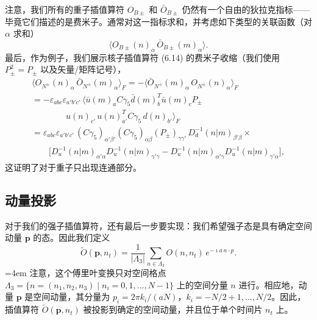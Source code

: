 注意，我们所有的重子插值算符 $O_{B\pm}$ 和 $\bar{O}_{B\pm}$ 仍然有一个自由的狄拉克指标——毕竟它们描述的是费米子。通常对这一指标求和，并考虑如下类型的关联函数（对 $\alpha$ 求和）
\begin{equation}
  \big\langle O_{B\pm}(n)_\alpha\, \bar{O}_{B\pm}(m)_\alpha \big\rangle .
\end{equation}
最后，作为例子，我们展示核子插值算符 (6.14) 的费米子收缩（我们使用 $P_\pm^2 = P_\pm$ 以及矢量/矩阵记号），
\begin{equation}
  \begin{gathered}
    \big\langle O_{N^\pm}(n)_\alpha\, \bar{O}_{N^\pm}(m)_\alpha \big\rangle_F
    = -\big\langle \bar{O}_{N^\pm}(m)_\alpha\, O_{N^\pm}(n)_\alpha \big\rangle_F \\
    = -\varepsilon_{abc}\varepsilon_{a'b'c'}\,
      \Big\langle \bar u(m)_a C\gamma_5 \bar d(m)_b^T \bar u(m)_c P_\pm \\
    \qquad\qquad u(n)_{c'}\, u(n)_{a'}^T C\gamma_5\, d(n)_{b'} \Big\rangle_F \\
    = \varepsilon_{abc}\varepsilon_{a'b'c'}\, (C\gamma_5)_{\alpha'\beta'}
      (C\gamma_5)_{\alpha\beta} (P_\pm)_{\gamma\gamma'}\,
      D_d^{-1}(n|m)_{\beta'\beta} \times \\
    \qquad \Big[ D_u^{-1}(n|m)_{\alpha'\alpha} D_u^{-1}(n|m)_{\gamma'\gamma}
      - D_u^{-1}(n|m)_{\alpha'\gamma} D_u^{-1}(n|m)_{\gamma'\alpha} \Big] ,
  \end{gathered}
\end{equation}
这证明了对于重子只出现连通部分。

\subsection{动量投影}

对于我们的强子插值算符，还有最后一步要实现：我们希望强子态是具有确定空间动量 $\mathbf{p}$ 的态。因此我们定义
\begin{equation}
  \widetilde{O}(\mathbf{p}, n_t) = \frac{1}{|\Lambda_3|}
    \sum_{n\in\Lambda_3} O(n, n_t)\, e^{-\imath a\, n\cdot p} .
\end{equation}
\begingroup\emergencystretch=4em 注意，这个傅里叶变换只对空间格点\linebreak[0] $\Lambda_3 = \{ n = (n_1, n_2, n_3) \mid n_i = 0, 1, \ldots, N-1 \}$ 上的空间分量 $n$ 进行。相应地，动量 $\mathbf{p}$ 是空间动量，其分量为 $p_i = 2\pi k_i/(aN)$，$k_i = -N/2 + 1, \ldots, N/2$。因此，插值算符 $\widetilde{O}(\mathbf{p}, n_t)$ 被投影到确定的空间动量，并且位于单个时间片 $n_t$ 上。\par\endgroup

